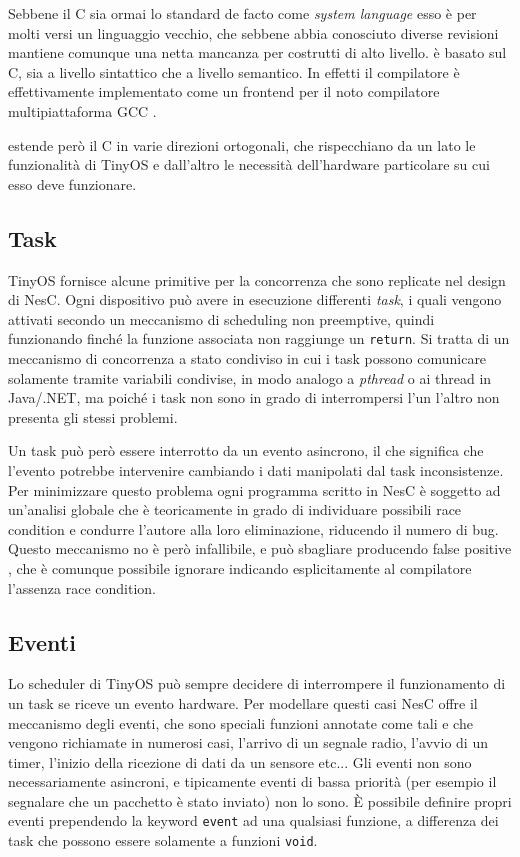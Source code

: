\documentclass[twoside,11pt,a4paper,italian,openany]{book}
\begin{document}
Sebbene il C sia ormai lo standard de facto come \emph{system language} esso è per molti versi 
un linguaggio vecchio, che sebbene abbia conosciuto diverse revisioni mantiene comunque una 
netta mancanza per costrutti di alto livello. 
\nesc è basato sul C, sia a livello sintattico che a livello semantico. 
In effetti il compilatore \nesc è effettivamente implementato come un frontend per il noto compilatore multipiattaforma GCC \cite{nesc}.

\nesc estende però il C in varie direzioni ortogonali, che rispecchiano da un lato le funzionalità
di TinyOS e dall'altro le necessità dell'hardware particolare su cui esso deve 
funzionare. 

\subsection{Task}
TinyOS fornisce alcune primitive per la concorrenza che sono replicate nel design di NesC.
Ogni dispositivo può avere in esecuzione differenti \emph{task}, i quali vengono attivati 
secondo un meccanismo di scheduling non preemptive, quindi funzionando finché la funzione 
associata non raggiunge un \texttt{return}. 
Si tratta di un meccanismo di concorrenza a stato condiviso in cui 
i task possono comunicare solamente tramite variabili condivise, in modo analogo a 
\emph{pthread} o ai thread in Java/.NET,  ma poiché i task non sono in grado di 
interrompersi l'un l'altro non presenta gli stessi problemi.

Un task può però essere interrotto da un evento asincrono, il che significa che l'evento 
potrebbe intervenire cambiando i dati manipolati dal task inconsistenze.
Per minimizzare questo problema ogni programma scritto in  NesC è soggetto ad 
un'analisi globale che è teoricamente in grado di individuare possibili race condition e 
condurre l'autore alla loro eliminazione, riducendo il numero di bug. 
Questo meccanismo no è però infallibile, e può sbagliare producendo false positive 
, che è comunque possibile ignorare indicando esplicitamente al compilatore 
l'assenza race condition.


\subsection{Eventi}
Lo scheduler di TinyOS può sempre decidere di interrompere il funzionamento di un task 
se riceve un evento hardware. 
Per modellare questi casi NesC offre il meccanismo degli eventi, 
che sono speciali funzioni annotate come tali e che vengono richiamate in numerosi 
casi, l'arrivo di un segnale radio, l'avvio di un timer, l'inizio della ricezione di dati da un sensore etc...
Gli eventi non sono necessariamente asincroni, e tipicamente eventi di bassa priorità (per esempio il segnalare che un pacchetto è stato inviato) non lo sono.
\`E possibile definire propri eventi prependendo la keyword \texttt{event} ad una qualsiasi 
funzione, a differenza dei task che possono essere solamente a funzioni \texttt{void}.
\end{document}
